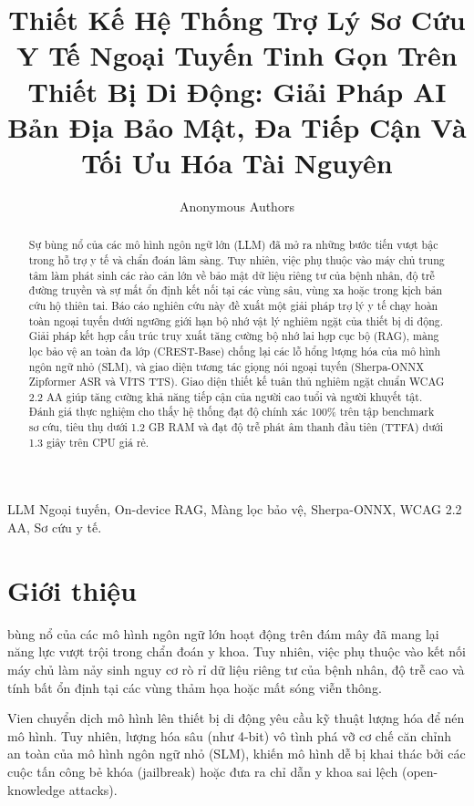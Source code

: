 \documentclass[journal]{IEEEtran}
\begin{document}
\title{Thiết Kế Hệ Thống Trợ Lý Sơ Cứu Y Tế Ngoại Tuyến Tinh Gọn Trên Thiết Bị Di Động: Giải Pháp AI Bản Địa Bảo Mật, Đa Tiếp Cận Và Tối Ưu Hóa Tài Nguyên}

\author{Anonymous Authors}

\maketitle

\begin{abstract}
Sự bùng nổ của các mô hình ngôn ngữ lớn (LLM) đã mở ra những bước tiến vượt bậc trong hỗ trợ y tế và chẩn đoán lâm sàng. Tuy nhiên, việc phụ thuộc vào máy chủ trung tâm làm phát sinh các rào cản lớn về bảo mật dữ liệu riêng tư của bệnh nhân, độ trễ đường truyền và sự mất ổn định kết nối tại các vùng sâu, vùng xa hoặc trong kịch bản cứu hộ thiên tai. Báo cáo nghiên cứu này đề xuất một giải pháp trợ lý y tế chạy hoàn toàn ngoại tuyến dưới ngưỡng giới hạn bộ nhớ vật lý nghiêm ngặt của thiết bị di động. Giải pháp kết hợp cấu trúc truy xuất tăng cường bộ nhớ lai hợp cục bộ (RAG), màng lọc bảo vệ an toàn đa lớp (CREST-Base) chống lại các lỗ hổng lượng hóa của mô hình ngôn ngữ nhỏ (SLM), và giao diện tương tác giọng nói ngoại tuyến (Sherpa-ONNX Zipformer ASR và VITS TTS). Giao diện thiết kế tuân thủ nghiêm ngặt chuẩn WCAG 2.2 AA giúp tăng cường khả năng tiếp cận của người cao tuổi và người khuyết tật. Đánh giá thực nghiệm cho thấy hệ thống đạt độ chính xác 100\% trên tập benchmark sơ cứu, tiêu thụ dưới 1.2 GB RAM và đạt độ trễ phát âm thanh đầu tiên (TTFA) dưới 1.3 giây trên CPU giá rẻ.
\end{abstract}

\begin{IEEEkeywords}
LLM Ngoại tuyến, On-device RAG, Màng lọc bảo vệ, Sherpa-ONNX, WCAG 2.2 AA, Sơ cứu y tế.
\end{IEEEkeywords}

\section{Giới thiệu}
 bùng nổ của các mô hình ngôn ngữ lớn hoạt động trên đám mây đã mang lại năng lực vượt trội trong chẩn đoán y khoa. Tuy nhiên, việc phụ thuộc vào kết nối máy chủ làm nảy sinh nguy cơ rò rỉ dữ liệu riêng tư của bệnh nhân, độ trễ cao và tính bất ổn định tại các vùng thảm họa hoặc mất sóng viễn thông.

Vien chuyển dịch mô hình lên thiết bị di động yêu cầu kỹ thuật lượng hóa để nén mô hình. Tuy nhiên, lượng hóa sâu (như 4-bit) vô tình phá vỡ cơ chế căn chỉnh an toàn của mô hình ngôn ngữ nhỏ (SLM), khiến mô hình dễ bị khai thác bởi các cuộc tấn công bẻ khóa (jailbreak) hoặc đưa ra chỉ dẫn y khoa sai lệch (open-knowledge attacks).
\end{document}
